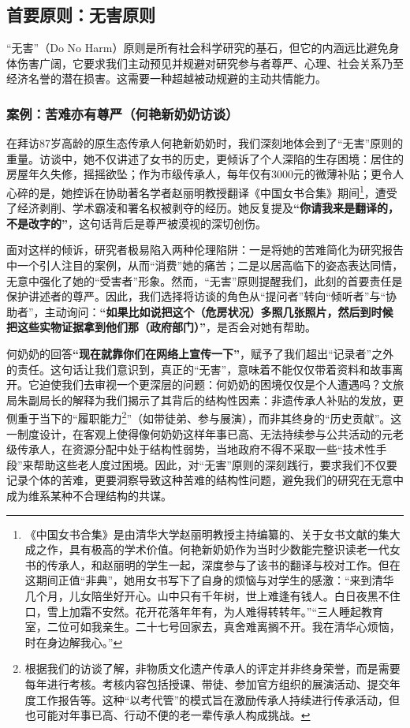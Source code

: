 \documentclass[UTF8]{ctexart}
\begin{document}
\subsection{首要原则：无害原则}
“无害”（Do No Harm）原则是所有社会科学研究的基石，但它的内涵远比避免身体伤害广阔，它要求我们主动预见并规避对研究参与者尊严、心理、社会关系乃至经济名誉的潜在损害。这需要一种超越被动规避的主动共情能力。

\subsubsection{案例：苦难亦有尊严（何艳新奶奶访谈）}
在拜访87岁高龄的原生态传承人何艳新奶奶时，我们深刻地体会到了“无害”原则的重量。访谈中，她不仅讲述了女书的历史，更倾诉了个人深陷的生存困境：居住的房屋年久失修，摇摇欲坠；作为市级传承人，每年仅有3000元的微薄补贴；更令人心碎的是，她控诉在协助著名学者赵丽明教授翻译《中国女书合集》期间\footnote[1]{《中国女书合集》是由清华大学赵丽明教授主持编纂的、关于女书文献的集大成之作，具有极高的学术价值。何艳新奶奶作为当时少数能完整识读老一代女书的传承人，和赵丽明的学生一起，深度参与了该书的翻译与校对工作。但在这期间正值“非典”，她用女书写下了自身的烦恼与对学生的感激：“来到清华几个月，儿女陪坐好开心。山中只有千年树，世上难逢有钱人。白日夜黑不住口，雪上加霜不安然。花开花落年年有，为人难得转转年。”“三人睡起教育室，二位可如我亲生。二十七号回家去，真舍难离搁不开。我在清华心烦恼，时在身边解我心。”}，遭受了经济剥削、学术霸凌和署名权被剥夺的经历。她反复提及\textbf{“你请我来是翻译的，不是改字的”}，这句话背后是尊严被漠视的深切创伤。

面对这样的倾诉，研究者极易陷入两种伦理陷阱：一是将她的苦难简化为研究报告中一个引人注目的案例，从而“消费”她的痛苦；二是以居高临下的姿态表达同情，无意中强化了她的“受害者”形象。然而，“无害”原则提醒我们，此刻的首要责任是保护讲述者的尊严。因此，我们选择将访谈的角色从“提问者”转向“倾听者”与“协助者”，主动询问：\textbf{“如果比如说把这个（危房状况）多照几张照片，然后到时候把这些实物证据拿到他们那（政府部门）”}，是否会对她有帮助。

何奶奶的回答\textbf{“现在就靠你们在网络上宣传一下”}，赋予了我们超出“记录者”之外的责任。这句话让我们意识到，真正的“无害”，意味着不能仅仅带着资料和故事离开。它迫使我们去审视一个更深层的问题：何奶奶的困境仅仅是个人遭遇吗？文旅局朱副局长的解释为我们揭示了其背后的结构性因素：非遗传承人补贴的发放，更侧重于当下的“履职能力\footnote[2]{根据我们的访谈了解，非物质文化遗产传承人的评定并非终身荣誉，而是需要每年进行考核。考核内容包括授课、带徒、参加官方组织的展演活动、提交年度工作报告等。这种“以考代管”的模式旨在激励传承人持续进行传承活动，但也可能对年事已高、行动不便的老一辈传承人构成挑战。}”（如带徒弟、参与展演），而非其终身的“历史贡献”。这一制度设计，在客观上使得像何奶奶这样年事已高、无法持续参与公共活动的元老级传承人，在资源分配中处于结构性弱势，当地政府不得不采取一些“技术性手段”来帮助这些老人度过困境。因此，对“无害”原则的深刻践行，要求我们不仅要记录个体的苦难，更要洞察导致这种苦难的结构性问题，避免我们的研究在无意中成为维系某种不合理结构的共谋。
\end{document}
